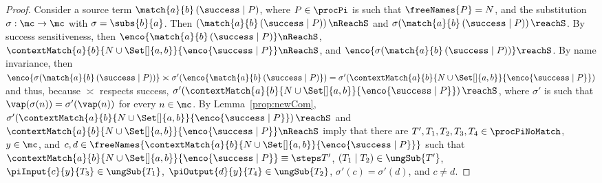 \documentclass[]{article}
\begin{document}
\begin{proof}
	Consider a source term $ \match{a}{b}\left( \success \mid P \right) $, where $ P \in \procPi $ is such that $ \freeNames{P} = N $, and the substitution $ \sigma : \mc \to \mc $ with $ \sigma = \subs{b}{a} $. Then $ \left( \match{a}{b}\left( \success \mid P \right) \right) \nReachS $ and $ \sigma\!\left( \match{a}{b}\left( \success \mid P \right) \right) \reachS $. By success sensitiveness, then $ \enco{\match{a}{b}\left( \success \mid P \right)} \nReachS $, \ie $ \contextMatch{a}{b}{N \cup \Set[]{ a, b }}{\enco{\success \mid P}} \nReachS $, and $ \enco{\sigma\!\left( \match{a}{b}\left( \success \mid P \right) \right)} \reachS $.
	By name invariance, then $ \enco{\sigma\!\left( \match{a}{b}\left( \success \mid P \right) \right)} \asymp \sigma'\!\left( \enco{\match{a}{b}\left( \success \mid P \right)} \right) = \sigma'\!\left( \contextMatch{a}{b}{N \cup \Set[]{ a, b }}{\enco{\success \mid P}} \right) $ and thus, because $ \asymp $ respects success, $ \sigma'\!\left( \contextMatch{a}{b}{N \cup \Set[]{ a, b }}{\enco{\success \mid P}} \right) \reachS $, where $ \sigma' $ is such that $ \vap\!\left( \sigma\!\left( n \right) \right) = \sigma'\!\left( \vap\!\left( n \right) \right) $ for every $ n \in \mc $.
	By Lemma~\ref{prop:newCom}, $ \sigma'\!\left( \contextMatch{a}{b}{N \cup \Set[]{ a, b }}{\enco{\success \mid P}} \right) \reachS $ and $ \contextMatch{a}{b}{N \cup \Set[]{ a, b }}{\enco{\success \mid P}} \nReachS $ imply that there are $ T', T_1, T_2, T_3, T_4 \in \procPiNoMatch $, $ y \in \mc $, and $ c, d \in \freeNames{\contextMatch{a}{b}{N \cup \Set[]{ a, b }}{\enco{\success \mid P}}} $ such that $ \contextMatch{a}{b}{N \cup \Set[]{ a, b }}{\enco{\success \mid P}} \equiv\steps T' $, $ \left( T_1 \mid T_2 \right) \in \ungSub{T'} $, $ \piInput{c}{y}{T_3} \in \ungSub{T_1} $, $ \piOutput{d}{y}{T_4} \in \ungSub{T_2} $, $ \sigma'\!\left( c \right) = \sigma'\!\left( d \right) $, and $ c \neq d $.
	

\end{proof}
\end{document}
